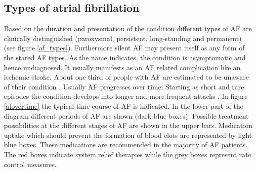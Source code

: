 \newpage
\subsection{Types of atrial fibrillation}

Based on the duration and presentation of the condition different types of AF are clinically distinguished \cite{ESC10, CE09} (paroxysmal, 
persistent, long-standing and permanent) (see figure \ref{af_types}). Furthermore silent AF may present itself as any form of the stated AF 
types. As the name indicates, the condition is asymptomatic and hence undiagnosed. It usually manifests as an AF related complication like an 
ischemic stroke. About one third of people with AF are estimated to be unaware of their condition \cite{ESC10}.\newline
\newline
Usually AF progresses over time. Starting as short and rare episodes the condition develops into longer and more frequent attacks \cite{ESC10}.
In figure \ref{afovertime} the typical time course of AF is indicated. In the lower part of the diagram different periods of AF are shown 
(dark blue boxes). Possible treatment possibilities at the different stages of AF are shown in the upper bars. Medication uptake which should 
prevent the formation of blood clots are represented by light blue boxes. These medications are recommended in the majority of AF patients. 
The red boxes indicate system relief therapies while the grey boxes represent rate control measures.

\vspace*{0.7cm}


